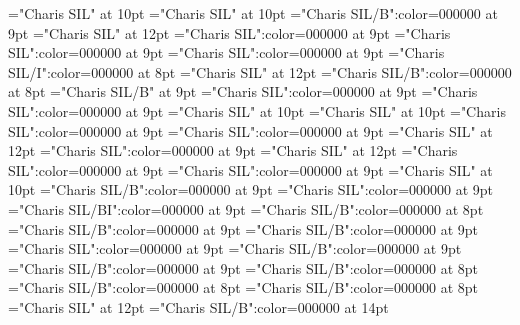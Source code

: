 \documentclass[gps1,twoside]{article}
\begin{document}
\pagestyle{plain}
\sloppy
\setlength{\parfillskip}{0pt plus 1fil}
\font\xitemte="Charis SIL" at 10pt
\font\xitemhi="Charis SIL" at 10pt
\font\xitemxitemcomplexformformbefore="Charis SIL/B":color=000000 at 9pt
\font\xitemxitemcomplexformrefsbefore="Charis SIL" at 12pt
\font\xitemxitemdefinitionbefore="Charis SIL":color=000000 at 9pt
\font\xitemxitementryrefcomponentbefore="Charis SIL":color=000000 at 9pt
\font\xitemxitementryreftypebefore="Charis SIL":color=000000 at 9pt
\font\xitemxitemexamplebefore="Charis SIL/I":color=000000 at 8pt
\font\xitemxitemexamplesbefore="Charis SIL" at 12pt
\font\xitemxitemheadwordbefore="Charis SIL/B":color=000000 at 8pt
\font\xitemxitemLexEntrypublishStemComponentTargetHeadWordRefbefore="Charis SIL/B" at 9pt
\font\xitemxitemLexEntryTypepublishStemComplexFormTypeReverseAbbrPubbefore="Charis SIL":color=000000 at 9pt
\font\xitemxitemLexEntryTypepublishStemEntryTypeAbbreviationPubbefore="Charis SIL":color=000000 at 9pt
\font\xitemxitemLexSensepublishStemGlossPubLdbefore="Charis SIL" at 10pt
\font\xitemxitemLexSensepublishStemGlossPubLebefore="Charis SIL" at 10pt
\font\xitemxitempartofspeechbefore="Charis SIL":color=000000 at 9pt
\font\xitemxitempictureLabelbefore="Charis SIL":color=000000 at 9pt
\font\xitemxitemprimaryrefsbefore="Charis SIL" at 12pt
\font\xitemxitempronunciationbefore="Charis SIL":color=000000 at 9pt
\font\xitemxitempronunciationsbefore="Charis SIL" at 12pt
\font\sensesensesensesbefore="Charis SIL":color=000000 at 9pt
\font\xitemxitemtranslationbefore="Charis SIL":color=000000 at 9pt
\font\xitemxitemtranslationLdbefore="Charis SIL" at 10pt
\font\xitemxitemcrossrefbefore="Charis SIL/B":color=000000 at 9pt
\font\xitemxitemcrossreftargetsbefore="Charis SIL":color=000000 at 9pt
\font\xitemxitemcrossreftypebefore="Charis SIL/BI":color=000000 at 9pt
\font\xitemxitemheadwordminorbefore="Charis SIL/B":color=000000 at 8pt
\font\xitemxitemmainentryrefbefore="Charis SIL/B":color=000000 at 9pt
\font\xitemxitemmainentryrefminorbefore="Charis SIL/B":color=000000 at 9pt
\font\xitemxitempronunciationminorbefore="Charis SIL":color=000000 at 9pt
\font\xitemxitemsensecrossrefbefore="Charis SIL/B":color=000000 at 9pt
\font\xitemxitemsensemainentryrefbefore="Charis SIL/B":color=000000 at 9pt
\font\xitemxitemheadwordsubbefore="Charis SIL/B":color=000000 at 8pt
\font\xitemxitemLexEntrypublishRootMinorPrimaryTargetMLHeadWordPubbefore="Charis SIL/B":color=000000 at 8pt
\font\xitemxitemLexEntrypublishStemMinorPrimaryTargetMLHeadWordPubbefore="Charis SIL/B":color=000000 at 8pt
\font\xitemtpi="Charis SIL" at 12pt
\font{}="Charis SIL/B":color=000000 at 14pt
\end{document}
